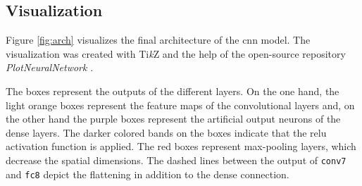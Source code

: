 \subsection{Visualization}
\label{subsec:training_of_the_cnn:architecture:visualization}
Figure \ref{fig:arch} visualizes the final architecture of the \acrshort{cnn} model.
The visualization was created with Ti\textit{k}Z and the help of the open-source repository \textit{PlotNeuralNetwork} \cite{training_arch_plot}.

The boxes represent the outputs of the different layers.
On the one hand, the light orange boxes represent the feature maps of the convolutional layers and, on the other hand the purple boxes represent the artificial output neurons of the dense layers.
The darker colored bands on the boxes indicate that the \acrshort{relu} activation function is applied.
The red boxes represent max-pooling layers, which decrease the spatial dimensions.
The dashed lines between the output of \texttt{conv7} and \texttt{fc8} depict the flattening in addition to the dense connection.

